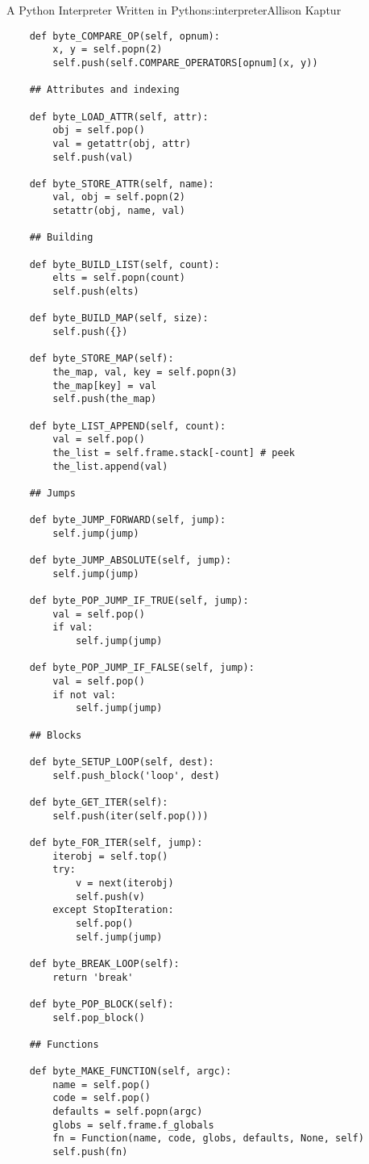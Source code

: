 \begin{aosachapter}{A Python Interpreter Written in Python}{s:interpreter}{Allison Kaptur}
\begin{verbatim}
    def byte_COMPARE_OP(self, opnum):
        x, y = self.popn(2)
        self.push(self.COMPARE_OPERATORS[opnum](x, y))

    ## Attributes and indexing

    def byte_LOAD_ATTR(self, attr):
        obj = self.pop()
        val = getattr(obj, attr)
        self.push(val)

    def byte_STORE_ATTR(self, name):
        val, obj = self.popn(2)
        setattr(obj, name, val)

    ## Building

    def byte_BUILD_LIST(self, count):
        elts = self.popn(count)
        self.push(elts)

    def byte_BUILD_MAP(self, size):
        self.push({})

    def byte_STORE_MAP(self):
        the_map, val, key = self.popn(3)
        the_map[key] = val
        self.push(the_map)

    def byte_LIST_APPEND(self, count):
        val = self.pop()
        the_list = self.frame.stack[-count] # peek
        the_list.append(val)

    ## Jumps

    def byte_JUMP_FORWARD(self, jump):
        self.jump(jump)

    def byte_JUMP_ABSOLUTE(self, jump):
        self.jump(jump)

    def byte_POP_JUMP_IF_TRUE(self, jump):
        val = self.pop()
        if val:
            self.jump(jump)

    def byte_POP_JUMP_IF_FALSE(self, jump):
        val = self.pop()
        if not val:
            self.jump(jump)

    ## Blocks

    def byte_SETUP_LOOP(self, dest):
        self.push_block('loop', dest)

    def byte_GET_ITER(self):
        self.push(iter(self.pop()))

    def byte_FOR_ITER(self, jump):
        iterobj = self.top()
        try:
            v = next(iterobj)
            self.push(v)
        except StopIteration:
            self.pop()
            self.jump(jump)

    def byte_BREAK_LOOP(self):
        return 'break'

    def byte_POP_BLOCK(self):
        self.pop_block()

    ## Functions

    def byte_MAKE_FUNCTION(self, argc):
        name = self.pop()
        code = self.pop()
        defaults = self.popn(argc)
        globs = self.frame.f_globals
        fn = Function(name, code, globs, defaults, None, self)
        self.push(fn)


\end{verbatim}
\end{aosachapter}
